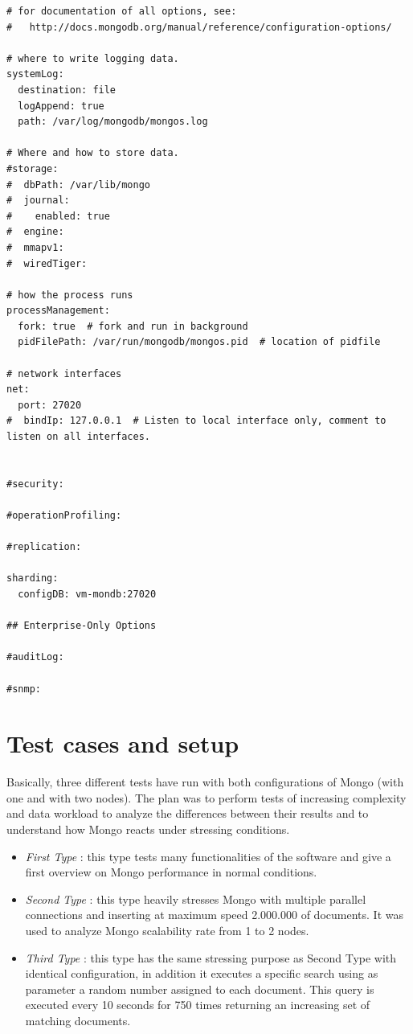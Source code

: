 \begin{itemize}
\begin{lstlisting}
# for documentation of all options, see:
#   http://docs.mongodb.org/manual/reference/configuration-options/

# where to write logging data.
systemLog:
  destination: file
  logAppend: true
  path: /var/log/mongodb/mongos.log

# Where and how to store data.
#storage:
#  dbPath: /var/lib/mongo
#  journal:
#    enabled: true
#  engine:
#  mmapv1:
#  wiredTiger:

# how the process runs
processManagement:
  fork: true  # fork and run in background
  pidFilePath: /var/run/mongodb/mongos.pid  # location of pidfile

# network interfaces
net:
  port: 27020
#  bindIp: 127.0.0.1  # Listen to local interface only, comment to listen on all interfaces.


#security:

#operationProfiling:

#replication:

sharding:
  configDB: vm-mondb:27020

## Enterprise-Only Options

#auditLog:

#snmp:
\end{lstlisting}
\end{itemize}
 
\section{Test cases and setup}
\label{sec:2}
Basically, three different tests have run with both configurations of Mongo (with one and with two nodes). 
The plan was to perform tests of increasing complexity and data workload to analyze the differences between their results and to  understand how Mongo reacts under stressing conditions.
\begin{itemize}
	\item \textit{First Type} : this type tests many functionalities of the software and  give a first overview on Mongo performance in normal conditions.
	\item \textit{Second Type} : this type heavily stresses Mongo with multiple parallel connections and inserting at maximum speed 2.000.000 of documents. It was used to analyze Mongo scalability rate from 1 to 2 nodes.
	\item \textit{Third Type} : this type has the same stressing purpose as Second Type with identical configuration, in addition it executes a specific search using as parameter a random number assigned to each document. This query is executed every 10 seconds for 750 times returning an increasing set of matching documents.
\end{itemize}



